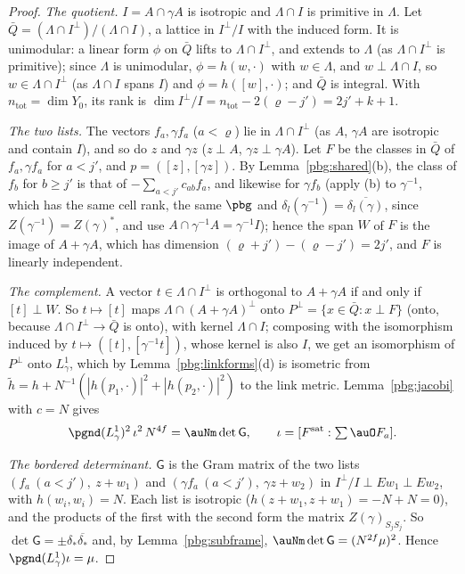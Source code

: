 \documentclass[10pt]{amsart}
\theoremstyle{definition}
\theoremstyle{remark}
\providecommand{\aubar}[1]{\overline{#1}}
\begin{document}
\begin{proof}
\emph{The quotient.} $I=A\cap\gamma A$ is isotropic and $\Lambda\cap I$ is primitive in $\Lambda$. Let
$\bar Q=(\Lambda\cap I^\perp)/(\Lambda\cap I)$, a lattice in $I^\perp/I$ with the induced form. It is
unimodular: a linear form $\phi$ on $\bar Q$ lifts to $\Lambda\cap I^\perp$, and extends to $\Lambda$
(as $\Lambda\cap I^\perp$ is primitive); since $\Lambda$ is unimodular, $\phi=h(w,\cdot)$ with $w\in
\Lambda$, and $w\perp\Lambda\cap I$, so $w\in\Lambda\cap I^\perp$ (as $\Lambda\cap I$ spans $I$) and
$\phi=h([w],\cdot)$; and $\bar Q$ is integral. With $n_{\mathrm{tot}}=\dim Y_0$, its rank is $\dim I^\perp/I=n_{\mathrm{tot}}-2(\varrho-j')=2j'+k+1$.

\emph{The two lists.} The vectors $f_a,\gamma f_a$ ($a<\varrho$) lie in $\Lambda\cap I^\perp$ (as $A$,
$\gamma A$ are isotropic and contain $I$), and so do $z$ and $\gamma z$ ($z\perp A$, $\gamma z\perp\gamma
A$). Let $F$ be the classes in $\bar Q$ of $f_a,\gamma f_a$ for $a<j'$, and $p=([z],[\gamma z])$. By
Lemma~\ref{pbg:shared}(b), the class of $f_b$ for $b\ge j'$ is that of $-\sum_{a<j'}c_{ab}f_a$, and
likewise for $\gamma f_b$ (apply (b) to $\gamma^{-1}$, which has the same cell rank, the same $\pbg$
and $\delta_l(\gamma^{-1})=\aubar{\delta_l(\gamma)}$, since $Z(\gamma^{-1})=Z(\gamma)^*$, and use $A\cap
\gamma^{-1}A=\gamma^{-1}I$); hence the span $W$ of $F$ is the image of
$A+\gamma A$, which has dimension $(\varrho+j')-(\varrho-j')=2j'$, and $F$ is linearly independent.

\emph{The complement.} A vector $t\in\Lambda\cap I^\perp$ is orthogonal to $A+\gamma A$ if and only if
$[t]\perp W$. So $t\mapsto[t]$ maps $\Lambda\cap(A+\gamma A)^\perp$ onto $P^\perp=\{x\in\bar Q:x\perp
F\}$ (onto, because $\Lambda\cap I^\perp\to\bar Q$ is onto), with kernel $\Lambda\cap I$; composing
with the isomorphism induced by $t\mapsto([t],[\gamma^{-1}t])$, whose kernel is also $I$, we get an
isomorphism of $P^\perp$ onto $L^1_\gamma$, which by Lemma~\ref{pbg:linkforms}(d) is isometric from
$\tilde h=h+N^{-1}(|h(p_1,\cdot)|^2+|h(p_2,\cdot)|^2)$ to the link metric. Lemma~\ref{pbg:jacobi} with
$c=N$ gives
\[
\pgnd(L^1_\gamma)^2\,\iota^2\,N^{4f}=\auNm\det\mathsf G,\qquad\iota=[F^{\mathrm{sat}}:\textstyle\sum
\auO F_a].
\]

\emph{The bordered determinant.} $\mathsf G$ is the Gram matrix of the two lists $(f_a\ (a<j'),\ z+w_1)$
and $(\gamma f_a\ (a<j'),\ \gamma z+w_2)$ in $I^\perp/I\perp Ew_1\perp Ew_2$, with $h(w_i,w_i)=N$. Each
list is isotropic ($h(z+w_1,z+w_1)=-N+N=0$), and the products of the first with the second form
the matrix $Z(\gamma)_{S_jS_j}$. So $\det\mathsf G=\pm\delta_*\aubar{\delta_*}$ and, by
Lemma~\ref{pbg:subframe}, $\auNm\det\mathsf G=(N^{2f}\mu)^2$. Hence $\pgnd(L^1_\gamma)\iota=\mu$.


\end{proof}
\end{document}
